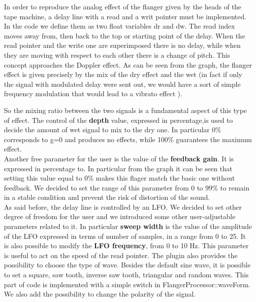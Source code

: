 In order to reproduce the analog effect of the flanger given by the heads of the tape machine, a delay line with a read and a writ pointer must be implemented. In the code we define them as two float variables dr and dw. The read index moves away from, then back to the top or starting point of the delay. When the read pointer and the write one are superimposed there is no delay, while when they are moving with respect to each other there is a change of pitch. This concept approaches the Doppler effect. As can be seen from the graph, the flanger effect is given precisely by the mix of the dry effect and the wet (in fact if only the signal with modulated delay were sent out, we would have a sort of simple frequency modulation that would lead to a vibrato effect ).\par
So the mixing ratio between the two signals is a fundamental aspect of this type of effect. The control of the \textbf{depth} value, expressed in percentage,is used to decide the amount of wet signal to mix to the dry one. In particular 0\% corresponds to g=0 and produces no effects, while 100\% guarantees the maximum effect.\\
Another free parameter for the user is the value of the \textbf{feedback gain}. It is expressed in percentage to. In particular from the graph it can be seen that setting this value equal to 0\% makes this flager match the basic one without feedback. We decided to set the range of this parameter from 0 to 99\% to remain in a stable condition and prevent the risk of distortion of the sound.\\
As said before, the delay line is controlled by an LFO. We decided to set other degree of freedom for the user and we introduced some other user-adjustable parameters related to it. In particular \textbf{sweep width} is the value of the amplitude of the LFO expressed in terms of number of samples, in a range from  0 to 25. It is also possible to modify the \textbf{LFO frequency}, from 0 to 10 Hz. This parameter is useful to act on the speed of the read pointer. The plugin also provides the possibility to choose the type of wave. Besides the default sine wave, it is possible to set a square, saw tooth, inverse saw tooth, triangular and random waves. This part of code is implemented with a simple switch in FlangerProcessor::waveForm.
We also add the possibility to change the polarity of the signal.





